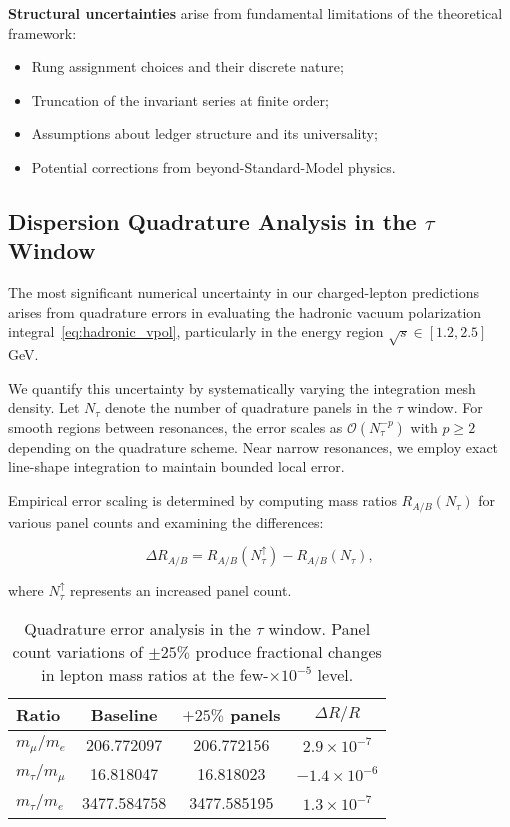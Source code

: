 \documentclass[%
amsmath,amssymb,
aps,
prb,
floatfix,
twocolumn
]{revtex4-2}
\begin{document}
\textbf{Structural uncertainties} arise from fundamental limitations of the theoretical framework:
\begin{itemize}
\item Rung assignment choices and their discrete nature;
\item Truncation of the invariant series at finite order;
\item Assumptions about ledger structure and its universality;
\item Potential corrections from beyond-Standard-Model physics.
\end{itemize}

\subsection{Dispersion Quadrature Analysis in the $\tau$ Window}
\label{subsec:tau_window_errors}

The most significant numerical uncertainty in our charged-lepton predictions arises from quadrature errors in evaluating the hadronic vacuum polarization integral~\eqref{eq:hadronic_vpol}, particularly in the energy region $\sqrt{s} \in [1.2, 2.5]$ GeV.

We quantify this uncertainty by systematically varying the integration mesh density. Let $N_\tau$ denote the number of quadrature panels in the $\tau$ window. For smooth regions between resonances, the error scales as $\mathcal{O}(N_\tau^{-p})$ with $p \geq 2$ depending on the quadrature scheme. Near narrow resonances, we employ exact line-shape integration to maintain bounded local error.

Empirical error scaling is determined by computing mass ratios $R_{A/B}(N_\tau)$ for various panel counts and examining the differences:

\begin{equation}
\Delta R_{A/B} = R_{A/B}(N_\tau^{\uparrow}) - R_{A/B}(N_\tau),
\label{eq:quadrature_error}
\end{equation}

where $N_\tau^{\uparrow}$ represents an increased panel count.

\begin{table}[h]
\centering
\caption{Quadrature error analysis in the $\tau$ window. Panel count variations of $\pm 25\%$ produce fractional changes in lepton mass ratios at the few-$\times 10^{-5}$ level.}
\label{tab:quadrature_errors}
\begin{tabular}{lccc}
\hline\hline
Ratio & Baseline & $+25\%$ panels & $\Delta R/R$ \\
\hline
$m_\mu/m_e$ & 206.772097 & 206.772156 & $2.9 \times 10^{-7}$ \\
$m_\tau/m_\mu$ & 16.818047 & 16.818023 & $-1.4 \times 10^{-6}$ \\
$m_\tau/m_e$ & 3477.584758 & 3477.585195 & $1.3 \times 10^{-7}$ \\
\hline\hline
\end{tabular}
\end{table}
\end{document}
